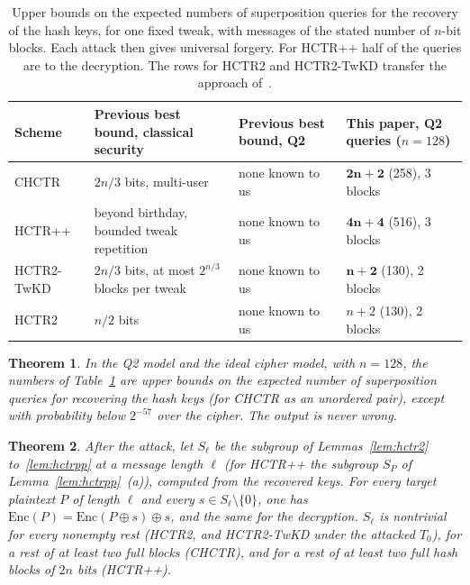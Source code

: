 \documentclass[11pt]{article}
\newtheorem{theorem}{Theorem}[section]
\theoremstyle{definition}
\theoremstyle{remark}
\newcommand{\Enc}{\mathrm{Enc}}
\begin{document}
\begin{table}[h]
\centering
\footnotesize
\renewcommand{\arraystretch}{1.25}
\begin{tabular}{@{}l>{\raggedright\arraybackslash}p{5.2cm}l>{\raggedright\arraybackslash}p{4.2cm}@{}}
\toprule
Scheme & Previous best bound, classical security & Previous best bound, Q2 & This paper, Q2 queries ($n=128$)\\
\midrule
CHCTR & $2n/3$ bits, multi-user~\cite{CHMNSS26} & none known to us & $\mathbf{2n+2}$ (258), 3 blocks\\
HCTR++ & beyond birthday, bounded tweak repetition~\cite{OKY26} & none known to us & $\mathbf{4n+4}$ (516), 3 blocks\\
HCTR2-TwKD & $2n/3$ bits, at most $2^{n/3}$ blocks per tweak~\cite{CHMNSS26} & none known to us & $\mathbf{n+2}$ (130), 2 blocks\\
HCTR2 & $n/2$ bits~\cite{CHB21} & none known to us & $n+2$ (130), 2 blocks\\
\bottomrule
\end{tabular}
\caption{Upper bounds on the expected numbers of superposition queries for the recovery of the hash keys, for one fixed tweak, with messages of the stated number of $n$-bit blocks. Each attack then gives universal forgery. For HCTR++ half of the queries are to the decryption. The rows for HCTR2 and HCTR2-TwKD transfer the approach of~\cite{RP20}.}
\label{tab:results}
\end{table}

\begin{theorem}\label{thm:main}
In the Q2 model and the ideal cipher model, with $n=128$, the numbers of Table~\ref{tab:results} are upper bounds on the expected number of superposition queries for recovering the hash keys (for CHCTR as an unordered pair), except with probability below $2^{-57}$ over the cipher. The output is never wrong.
\end{theorem}

\begin{theorem}\label{thm:forge}
After the attack, let $S_\ell$ be the subgroup of Lemmas~\ref{lem:hctr2} to~\ref{lem:hctrpp} at a message length $\ell$ (for HCTR++ the subgroup $S_P$ of Lemma~\ref{lem:hctrpp}~(a)), computed from the recovered keys. For every target plaintext $P$ of length $\ell$ and every $s\in S_\ell\setminus\{0\}$, one has $\Enc(P)=\Enc(P\oplus s)\oplus s$, and the same for the decryption. $S_\ell$ is nontrivial for every nonempty rest (HCTR2, and HCTR2-TwKD under the attacked $T_0$), for a rest of at least two full blocks (CHCTR), and for a rest of at least two full hash blocks of $2n$ bits (HCTR++).
\end{theorem}
\end{document}
